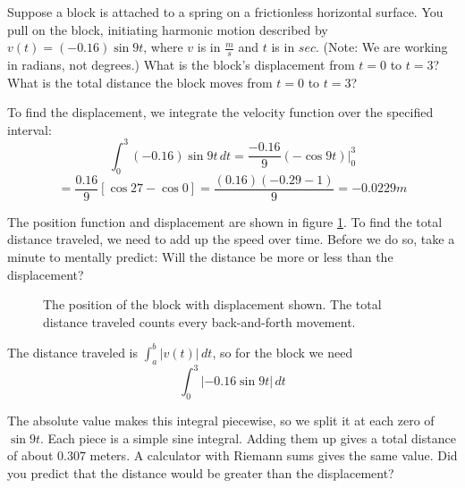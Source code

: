Suppose a block is attached to a spring on a frictionless horizontal 
surface. You pull on the block, initiating harmonic motion described 
by $v(t) = (-0.16)\sin{9t}$, where $v$ is in $\frac{m}{s}$ and $t$ is 
in $sec$. (Note: We are working in radians, not degrees.) What is the 
block's displacement from $t = 0$ to $t = 3$? What is the total 
distance the block moves from $t = 0$ to $t = 3$? 

To find the displacement, we integrate the velocity function over the 
specified interval:
$$\int_0^3 (-0.16)\sin{9t}\,dt = \frac{-0.16}{9}(-\cos{9t})|_0^3$$
$$=\frac{0.16}{9}[\cos{27} - \cos{0}] = \frac{(0.16)(-0.29 - 1)}{9} 
= -0.0229 m$$

The position function and displacement are shown in figure 
\ref{fig:block}. To find the total distance traveled, we need to add up the 
speed over time. Before we do so, take a minute to mentally 
predict: Will the distance be more or less than the displacement?

\begin{figure}[H]
\centering
    \caption{The position of the block with displacement shown. The 
    total distance traveled counts every back-and-forth movement.}
    \label{fig:block}
\end{figure}

The distance traveled is $\int_a^b |v(t)|\,dt$, so for the block we need
$$\int_0^3 \left|-0.16\sin{9t}\right|\,dt$$

The absolute value makes this integral piecewise, so we split it at each zero of $\sin{9t}$. Each piece is a simple sine integral. Adding them up gives a total distance of about $0.307$ meters. A calculator with Riemann sums gives the same value. Did you predict that the distance would be 
greater than the displacement?

